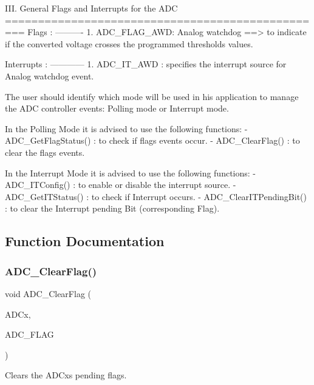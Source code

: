 \begin{DoxyVerb}
  III. General Flags and Interrupts for the ADC
  ================================================= 
  Flags :
  ---------- 
     1. ADC_FLAG_AWD: Analog watchdog ==> to indicate if the converted voltage 
              crosses the programmed thresholds values.
              
  Interrupts :
  ------------
     1. ADC_IT_AWD : specifies the interrupt source for Analog watchdog event. 

  
  The user should identify which mode will be used in his application to manage 
  the ADC controller events: Polling mode or Interrupt mode.
  
  In the Polling Mode it is advised to use the following functions:
      - ADC_GetFlagStatus() : to check if flags events occur. 
      - ADC_ClearFlag()     : to clear the flags events.
      
  In the Interrupt Mode it is advised to use the following functions:
     - ADC_ITConfig()          : to enable or disable the interrupt source.
     - ADC_GetITStatus()       : to check if Interrupt occurs.
     - ADC_ClearITPendingBit() : to clear the Interrupt pending Bit 
                                 (corresponding Flag). 
\end{DoxyVerb}
 

\subsection{Function Documentation}
\mbox{\label{group__ADC__Group7_gaf34f36798f811b4a41321ea2d12118d4}} 
\subsubsection{A\+D\+C\+\_\+\+Clear\+Flag()}
{\footnotesize\ttfamily void A\+D\+C\+\_\+\+Clear\+Flag (\begin{DoxyParamCaption}\item[{\textbf{ A\+D\+C\+\_\+\+Type\+Def} $\ast$}]{A\+D\+Cx,  }\item[{uint8\+\_\+t}]{A\+D\+C\+\_\+\+F\+L\+AG }\end{DoxyParamCaption})}



Clears the A\+D\+Cx\textquotesingle{}s pending flags. 


